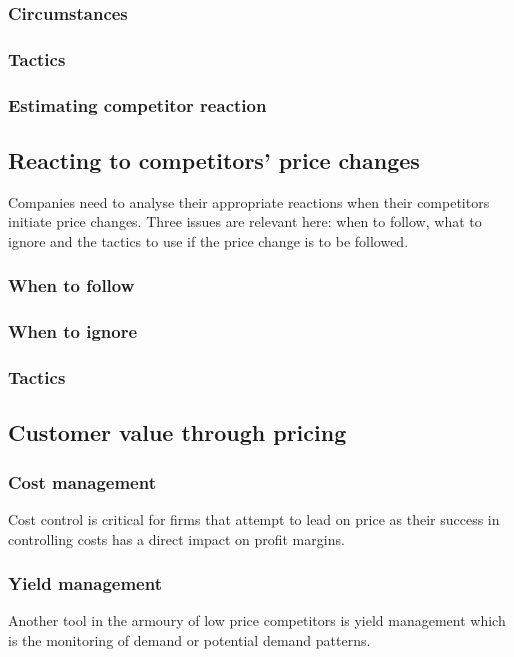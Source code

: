 \documentclass{article}
\begin{document}
\subsubsection*{Circumstances}
\subsubsection*{Tactics}
\subsubsection*{Estimating competitor reaction}

\subsection{Reacting to competitors' price changes}
Companies need to analyse their appropriate reactions when their competitors initiate price changes. Three issues  are relevant here: when to follow, what to ignore and the tactics to use if the price change is to be followed.

\subsubsection*{When to follow}
\subsubsection*{When to ignore}
\subsubsection*{Tactics}

\subsection{Customer value through pricing}

\subsubsection*{Cost management}
Cost control is critical for firms that attempt to lead on price as their success in controlling costs has a direct impact on profit margins.

\subsubsection*{Yield management}
Another tool in the armoury of low price competitors is yield management which is the monitoring of demand or potential demand patterns.
\end{document}
